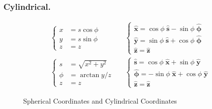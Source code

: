 \documentclass[../../../main.tex]{subfiles}
\begin{document}
\subsubsection{Cylindrical.}
\begin{align*}
   & \begin{cases}
        x &= s \cos \phi \\
        y &= s \sin \phi \\
        z & =z
    \end{cases}&&
    \begin{cases}
        \mathbf{\hat{x}} =  \cos \phi \;\mathbf{\hat{s}}-  \sin \phi \;\boldsymbol{\hat{\phi}} \\
        \mathbf{\hat{y}} =  \sin \phi \;\mathbf{\hat{s}} + \cos \phi \;\boldsymbol{\hat{\phi}} \\
        \mathbf{\hat{z}} = \mathbf{\hat{z}} 
    \end{cases}\\
   &\begin{cases}
        s &= \sqrt{x^2 + y^2 }\\
        \phi &=\arctan y/z\\
        z & = z
    \end{cases}&&
    \begin{cases} 
        \mathbf{\hat{s}} =  \cos \phi \;\mathbf{\hat{x}} +  \sin \phi \;\boldsymbol{\hat{y}}\\
        \boldsymbol{\hat{\phi}} = -\sin  \phi \;\mathbf{\hat{x}} + \cos \phi \;\boldsymbol{\hat{y}} \\
        \boldsymbol{\hat{z}} = \boldsymbol{\hat{z}}
    \end{cases}
\end{align*}

\begin{figure*}
    \centering
    \caption*{Spherical Coordinates and Cylindrical Coordinates}
\end{figure*}
\end{document}
